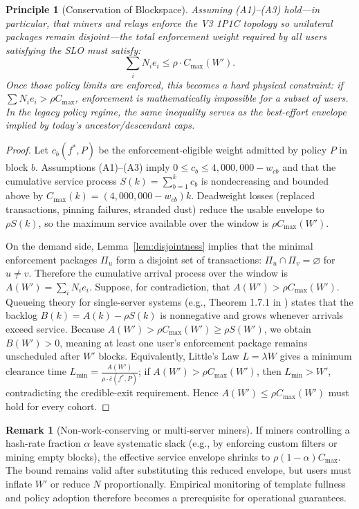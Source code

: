 \documentclass{article}
\newtheorem{principle}{Principle}
\theoremstyle{definition}
\newtheorem{remark}{Remark}
\begin{document}
\begin{principle}[Conservation of Blockspace]
Assuming (A1)--(A3) hold---in particular, that miners and relays enforce the V3 1P1C topology so unilateral packages remain disjoint---the total enforcement weight required by all users satisfying the SLO must satisfy:
\small
\begin{equation*}
\sum_i N_i e_i \le \rho \cdot C_{\max}(W').
\end{equation*}
\normalsize
Once those policy limits are enforced, this becomes a hard physical constraint: if $\sum N_i e_i > \rho C_{\max}$, enforcement is mathematically impossible for a subset of users. In the legacy policy regime, the same inequality serves as the best-effort envelope implied by today's ancestor/descendant caps.
\end{principle}

\begin{proof}
Let $c_b(f^*,P)$ be the enforcement-eligible weight admitted by policy $P$ in block $b$. Assumptions (A1)--(A3) imply $0 \le c_b \le 4{,}000{,}000 - w_{cb}$ and that the cumulative service process $S(k)=\sum_{b=1}^{k} c_b$ is nondecreasing and bounded above by $C_{\max}(k) = (4{,}000{,}000 - w_{cb})k$. Deadweight losses (replaced transactions, pinning failures, stranded dust) reduce the usable envelope to $\rho S(k)$, so the maximum service available over the window is $\rho C_{\max}(W')$.

On the demand side, Lemma~\ref{lem:disjointness} implies that the minimal enforcement packages $\Pi_u$ form a disjoint set of transactions: $\Pi_u \cap \Pi_v = \varnothing$ for $u \ne v$. Therefore the cumulative arrival process over the window is $A(W') = \sum_i N_i e_i$. Suppose, for contradiction, that $A(W') > \rho C_{\max}(W')$. Queueing theory for single-server systems (e.g., Theorem 1.7.1 in \cite{kleinrock}) states that the backlog $B(k)=A(k)-\rho S(k)$ is nonnegative and grows whenever arrivals exceed service. Because $A(W') > \rho C_{\max}(W') \ge \rho S(W')$, we obtain $B(W') > 0$, meaning at least one user's enforcement package remains unscheduled after $W'$ blocks. Equivalently, Little's Law $L=\lambda W$ \cite{little} gives a minimum clearance time $L_{\min} = \frac{A(W')}{\rho \cdot \bar c(f^*,P)}$; if $A(W') > \rho C_{\max}(W')$, then $L_{\min} > W'$, contradicting the credible-exit requirement. Hence $A(W') \le \rho C_{\max}(W')$ must hold for every cohort.
\end{proof}

\begin{remark}[Non-work-conserving or multi-server miners]
If miners controlling a hash-rate fraction $\alpha$ leave systematic slack (e.g., by enforcing custom filters or mining empty blocks), the effective service envelope shrinks to $\rho (1-\alpha) C_{\max}$. The bound remains valid after substituting this reduced envelope, but users must inflate $W'$ or reduce $N$ proportionally. Empirical monitoring of template fullness and policy adoption therefore becomes a prerequisite for operational guarantees.
\end{remark}
\end{document}
